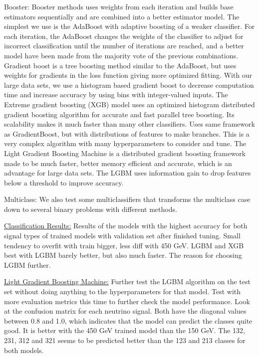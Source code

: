 \documentclass[a4paper, american, 12pt]{report}
\begin{document}
	Booster: Booster methods uses weights from each iteration and builds base estimators sequentially and are combined into a better estimator model. The simplest we use is the AdaBoost with adaptive boosting of a weaker classifier. For each iteration, the AdaBoost changes the weights of the classifier to adjust for incorrect classification until the number of iterations are reached, and a better model have been made from the majority vote of the previous combinations. Gradient boost is a tree boosting method similar to the AdaBoost, but uses weights for gradients in the loss function giving more optimized fitting. With our large data sets, we use a histogram based gradient boost to decrease computation time and increase accuracy by using bins with integer-valued inputs. The Extreme gradient boosting (XGB) model uses an optimized histogram distributed gradient boosting algorithm for accurate and fast parallel tree boosting. Its scalability makes it much faster than many other classifiers. Uses same framework as GradientBoost, but with distributions of features to make branches. This is a very complex algorithm with many hyperparameters to consider and tune. The Light Gradient Boosting Machine is a distributed gradient boosting framework made to be much faster, better memory efficient and accurate, which is an advantage for large data sets. The LGBM uses information gain to drop features below a threshold to improve accuracy.
	
	Multiclass: We also test some multiclassifiers that transforms the multiclass case down to several binary problems with different methods. 
	
	
	\underline{Classification Results:}
	Results of the models with the highest accuracy for both signal types of trained models with validation set after finished tuning. Small tendency to overfit with train bigger, less diff with 450 GeV. LGBM and XGB best with LGBM barely better, but also much faster. The reason for choosing LGBM further.
	
	
	\underline{Light Gradient Boosting Machine:}
	Further test the LGBM algorithm on the test set without doing anything to the hyperparameters for that model. Test with more evaluation metrics this time to further check the model performance. Look at the confusion matrix for each neutrino signal. Both have the diagonal values between 0.8 and 1.0, which indicates that the model can predict the classes quite good. It is better with the 450 GeV trained model than the 150 GeV. The 132, 231, 312 and 321 seems to be predicted better than the 123 and 213 classes for both models.
	
\end{document}
